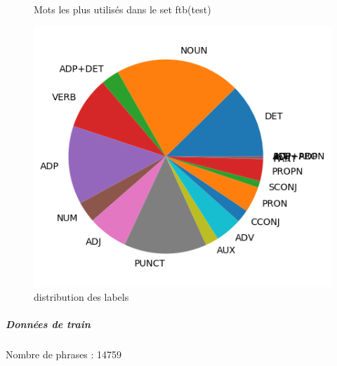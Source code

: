 \begin{figure}[H]
\begin{minipage}{0.48\textwidth}
\begin{tabular}{|l || *{11 }{|c} |}
\end{tabular}
\caption{ Mots les plus utilisés dans le set ftb(test) } \label{Fig:muw}\end{minipage} 
\begin{minipage}{0.48\textwidth} \centering
\includegraphics[width=.7\linewidth]{ftbtest_img.png}
\caption{distribution des labels}
\end{minipage}
\end{figure} \subparagraph{Données de train \\ }  
 Nombre de phrases : 14759\\ 
